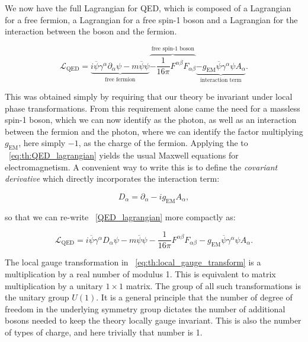 We now have the full Lagrangian for QED, which is composed of a Lagrangian for a free fermion, a Lagrangian for a free spin-1 boson and a Lagrangian for the interaction between the boson and the fermion. 

\begin{equation}
\label{eq:th:QED_lagrangian}
\mathcal{L}_{\textrm{QED}} = \underbrace{i\overline{\psi} \gamma^{\alpha} \partial_{\alpha} \psi - m\overline{\psi}\psi}_{\textrm{free fermion}}   \overbrace{-\frac{1}{16\pi} F^{\alpha\beta}F_{\alpha\beta}}^{\textrm{free spin-1 boson}}  \underbrace{- g_{\textrm{EM}}\overline{\psi}\gamma^{\alpha}\psi A_{\alpha}}_{\textrm{interaction term}}.
\end{equation}

This was obtained simply by requiring that our theory be invariant under local phase transformations. From this requirement alone came the need for a massless spin-1 boson, which we can now identify as the photon, as well as an interaction between the fermion and the photon, where we can identify the factor multiplying $g_{\textrm{EM}}$, here simply $-1$, as the charge of the fermion. Applying the \ELE to \Eq~\ref{eq:th:QED_lagrangian} yields the usual Maxwell equations for electromagnetism. A convenient way to write this is to define the \emph{covariant derivative} which directly incorporates the interaction term:

\begin{equation}
\label{eq:th:covariant_derivative}
D_{\alpha} = \partial_{\alpha} - i g_{\textrm{EM}}A_{\alpha},
\end{equation}

so that we can re-write \Eq~\ref{QED_lagrangian} more compactly as:

\begin{equation}
\label{eq:th:QED_lagrangian}
\mathcal{L}_{\textrm{QED}} = i\overline{\psi} \gamma^{\alpha} D_{\alpha} \psi - m\overline{\psi}\psi -\frac{1}{16\pi} F^{\alpha\beta}F_{\alpha\beta} -  g_{\textrm{EM}}\overline{\psi}\gamma^{\alpha}\psi A_{\alpha}.
\end{equation}

The local gauge transformation in \Eq~\ref{eq:th:local_gauge_transform} is a multiplication by a real number of modulus 1. This is equivalent to matrix multiplication by a unitary $1\times1$ matrix. The group of all such transformations is the unitary group $U(1)$. It is a general principle that the number of degree of freedom in the underlying symmetry group dictates the number of additional bosons needed to keep the theory locally gauge invariant. This is also the number of types of charge, and here trivially that number is 1.

